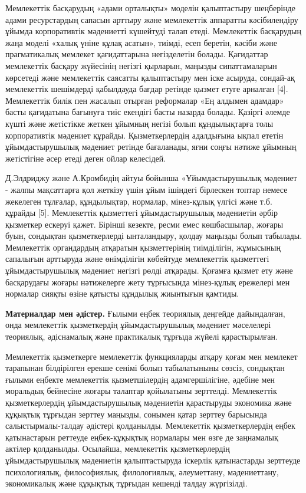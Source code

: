 Мемлекеттік басқарудың «адами орталықты» моделін қалыптастыру шеңберінде
адами ресурстардың сапасын арттыру және мемлекеттік аппаратты
кәсібилендіру ұйымда корпоративтік мәдениетті күшейтуді талап етеді.
Мемлекеттік басқарудың жаңа моделі «халық үніне құлақ асатын», тиімді,
есеп беретін, кәсіби және прагматикалық мемлекет қағидаттарына
негізделетін болады. Қағидаттар мемлекеттік басқару жүйесінің негізгі
қырларын, маңызды сипаттамаларын көрсетеді және мемлекеттік саясатты
қалыптастыру мен іске асыруда, сондай-ақ мемлекеттік шешімдерді
қабылдауда бағдар ретінде қызмет етуге арналған {[}4{]}. Мемлекеттік
билік пен жасалып отырған реформалар «Ең алдымен адамдар» басты
қағидатына бағынуға тиіс екендігі басты назарда болады. Қазіргі әлемде
күшті және жетістікке жеткен ұйымның негізі болып құндылықтарға толы
корпоративтік мәдениет құрайды. Қызметкерлердің адалдығына ықпал ететін
ұйымдастырушылық мәдениет ретінде бағаланады, яғни соңғы нәтиже ұйымның
жетістігіне әсер етеді деген ойлар келесідей.

Д.Элдриджу және А.Кромбидің айтуы бойынша «Ұйымдастырушылық мәдениет -
жалпы мақсаттарға қол жеткізу үшін ұйым ішіндегі бірлескен топтар немесе
жекелеген тұлғалар, құндылықтар, нормалар, мінез-құлық үлгісі және т.б.
құрайды {[}5{]}. Мемлекеттік қызметтегі ұйымдастырушылық мәдениетін
әрбір қызметкер ескеруі қажет. Бірінші кезекте, ресми емес көшбасшылар,
жоғары буын, сондықтан қызметкерлерді ынталандыру, қолдау маңызды болып
табылады. Мемлекеттік органдардың атқаратын қызметтерінің тиімділігін,
жұмысының сапалығын арттыруда және өнімділігін көбейтуде мемлекеттік
қызметтегі ұйымдастырушылық мәдениет негізгі рөлді атқарады. Қоғамға
қызмет ету және басқарудағы жоғары нәтижелерге жету тұрғысында
мінез-құлық ережелері мен нормалар сияқты өзіне қатысты құндылық
жиынтығын қамтиды.

{\bfseries Материалдар мен әдістер.} Ғылыми еңбек теориялық деңгейде
дайындалған, онда мемлекеттік қызметкердің ұйымдастырушылық мәдениет
мәселелері теориялық, әдіснамалық және практикалық тұрғыда жүйелі
қарастырылған.

Мемлекеттік қызметкерге мемлекеттік функцияларды атқару қоғам мен
мемлекет тарапынан білдірілген ерекше сенімі болып табылатыныны сөзсіз,
сондықтан ғылыми еңбекте мемлекеттік қызметшілердің адамгершілігіне,
әдебіне мен моральдық бейнесіне жоғары талаптар қойылатыны зерттелді.
Мемлекеттік қызметкерлердің ұйымдастырушылық мәдениетін қарастыруды
экономика және құқықтық тұрғыдан зерттеу маңызды, сонымен қатар зерттеу
барысында салыстырмалы-талдау әдістері қолданылды. Мемлекеттік
қызметкерлердің еңбек қатынастарын реттеуде еңбек-құқықтық нормалары мен
өзге де заңнамалық актілер қолданылды. Осылайша, мемлекеттік
қызметкерлердің ұйымдастырушылық мәдениетін қалыптастыруда іскерлік
қатынастарды зерттеуде психологиялық, философиялық, филологиялық,
әлеуметтану, мәдениеттану, экономикалық және құқықтық тұрғыдан кешенді
талдау жүргізілді.

